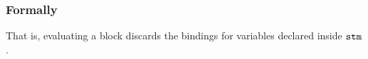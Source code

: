 \subsubsection{Formally}
\begin{mathpar}
\end{mathpar}

That is, evaluating a block discards the bindings for variables declared inside $\stm$.
